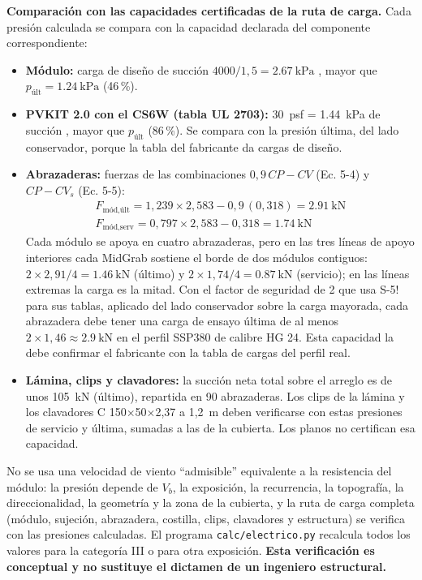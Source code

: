 \documentclass[12pt]{article}
\begin{document}
\textbf{Comparación con las capacidades certificadas de la ruta de carga.} Cada presión calculada se compara con la capacidad declarada del componente correspondiente:
\begin{itemize}
\item \textbf{Módulo:} carga de diseño de succión $4000/1{,}5=\SI{2.67}{\kilo\pascal}$ \cite{csDatasheet}, mayor que $p_{\text{últ}}=\SI{1.24}{\kilo\pascal}$ (46\,\%).
\item \textbf{PVKIT 2.0 con el CS6W (tabla UL 2703):} 30~psf = \SI{1.44}{\kilo\pascal} de succión \cite{s5manual}, mayor que $p_{\text{últ}}$ (86\,\%). Se compara con la presión última, del lado conservador, porque la tabla del fabricante da cargas de diseño.
\item \textbf{Abrazaderas:} fuerzas de las combinaciones $0{,}9\,CP - CV$ (Ec. 5-4) y $CP - CV_s$ (Ec. 5-5):
\begin{gather}
F_{\text{mód,últ}}=1{,}239\times2{,}583-0{,}9\,(0{,}318)=\SI{2.91}{\kilo\newton}\\
F_{\text{mód,serv}}=0{,}797\times2{,}583-0{,}318=\SI{1.74}{\kilo\newton}
\end{gather}
Cada módulo se apoya en cuatro abrazaderas, pero en las tres líneas de apoyo interiores cada MidGrab sostiene el borde de dos módulos contiguos: $2\times2{,}91/4=\SI{1.46}{\kilo\newton}$ (último) y $2\times1{,}74/4=\SI{0.87}{\kilo\newton}$ (servicio); en las líneas extremas la carga es la mitad. Con el factor de seguridad de 2 que usa S-5! para sus tablas, aplicado del lado conservador sobre la carga mayorada, cada abrazadera debe tener una carga de ensayo última de al menos $2\times1{,}46\approx\SI{2.9}{\kilo\newton}$ en el perfil SSP380 de calibre HG 24. Esta capacidad la debe confirmar el fabricante con la tabla de cargas del perfil real.
\item \textbf{Lámina, clips y clavadores:} la succión neta total sobre el arreglo es de unos \SI{105}{\kilo\newton} (último), repartida en 90 abrazaderas. Los clips de la lámina y los clavadores C 150$\times$50$\times$2,37 a 1,2~m deben verificarse con estas presiones de servicio y última, sumadas a las de la cubierta. Los planos no certifican esa capacidad.
\end{itemize}
No se usa una velocidad de viento ``admisible'' equivalente a la resistencia del módulo: la presión depende de $V_b$, la exposición, la recurrencia, la topografía, la direccionalidad, la geometría y la zona de la cubierta, y la ruta de carga completa (módulo, sujeción, abrazadera, costilla, clips, clavadores y estructura) se verifica con las presiones calculadas. El programa \texttt{calc/electrico.py} recalcula todos los valores para la categoría III o para otra exposición. \textbf{Esta verificación es conceptual y no sustituye el dictamen de un ingeniero estructural.}
\end{document}
